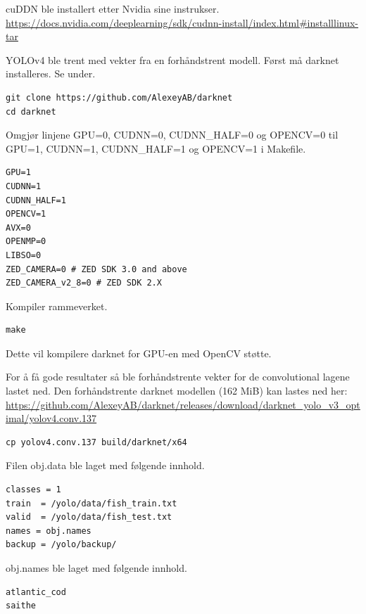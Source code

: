 cuDDN ble installert etter Nvidia sine instrukser. \url{https://docs.nvidia.com/deeplearning/sdk/cudnn-install/index.html#installlinux-tar}

YOLOv4 ble trent med vekter fra en forhåndstrent modell. Først må darknet installeres. Se under.

\begin{verbatim}
git clone https://github.com/AlexeyAB/darknet
cd darknet
\end{verbatim}

Omgjør linjene GPU=0, CUDNN=0, CUDNN\_HALF=0 og OPENCV=0 til GPU=1, CUDNN=1, CUDNN\_HALF=1 og OPENCV=1 i Makefile.

\begin{lstlisting}[language={}, caption=De første linjene i Makefile]
GPU=1
CUDNN=1
CUDNN_HALF=1
OPENCV=1
AVX=0
OPENMP=0
LIBSO=0
ZED_CAMERA=0 # ZED SDK 3.0 and above
ZED_CAMERA_v2_8=0 # ZED SDK 2.X
\end{lstlisting}

Kompiler rammeverket.

\begin{verbatim}
make
\end{verbatim}

Dette vil kompilere darknet for GPU-en med OpenCV støtte.


For å få gode resultater så ble forhåndstrente vekter for de convolutional lagene lastet ned. Den forhåndstrente darknet modellen (162 MiB) kan lastes ned her: \url{https://github.com/AlexeyAB/darknet/releases/download/darknet_yolo_v3_optimal/yolov4.conv.137}

\begin{verbatim}
cp yolov4.conv.137 build/darknet/x64
\end{verbatim}

Filen obj.data ble laget med følgende innhold.

\begin{lstlisting}[language={}, caption=obj.data]
classes = 1
train  = /yolo/data/fish_train.txt
valid  = /yolo/data/fish_test.txt
names = obj.names
backup = /yolo/backup/
\end{lstlisting}

obj.names ble laget med følgende innhold.

\begin{lstlisting}[language={}, caption=obj.names]
atlantic_cod
saithe
\end{lstlisting}

